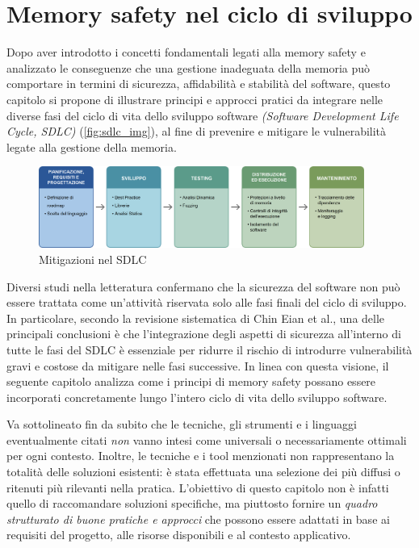 \chapter{Memory safety nel ciclo di sviluppo}
\label{cha:sdlc}

Dopo aver introdotto i concetti fondamentali legati alla memory safety e
analizzato le conseguenze che una gestione inadeguata della memoria può
comportare in termini di sicurezza, affidabilità e stabilità del software,
questo capitolo si propone di illustrare principi e approcci pratici da
integrare nelle diverse fasi del ciclo di vita dello sviluppo software \textit{(Software
Development Life Cycle, SDLC)} (\autoref{fig:sdlc_img}), al fine di prevenire e
mitigare le vulnerabilità legate alla gestione della memoria.

\begin{figure}[htbp]
  \centering
  \includegraphics[width=0.95\textwidth]{images/sdlc_recap.png}
  \caption[Schema SDLC]{Mitigazioni nel SDLC\protect}
  \label{fig:sdlc_img}
\end{figure}

Diversi studi nella letteratura confermano che la sicurezza del software non può
essere trattata come un'attività riservata solo alle fasi finali del ciclo di sviluppo.
In particolare, secondo la revisione sistematica di Chin Eian et al.\cite{security_in_sdlc},
una delle principali conclusioni è che l'integrazione degli aspetti di sicurezza
all'interno di tutte le fasi del SDLC è essenziale per ridurre il rischio di
introdurre vulnerabilità gravi e costose da mitigare nelle fasi successive. In linea
con questa visione, il seguente capitolo analizza come i principi di memory
safety possano essere incorporati concretamente lungo l'intero ciclo di vita
dello sviluppo software.

Va sottolineato fin da subito che le tecniche, gli strumenti e i linguaggi eventualmente
citati \textit{non} vanno intesi come universali o necessariamente ottimali per
ogni contesto. Inoltre, le tecniche e i tool menzionati non rappresentano la
totalità delle soluzioni esistenti: è stata effettuata una selezione dei più diffusi
o ritenuti più rilevanti nella pratica. L'obiettivo di questo capitolo non è
infatti quello di raccomandare soluzioni specifiche, ma piuttosto fornire un \textit{quadro
strutturato di buone pratiche e approcci} che possono essere adattati in base ai
requisiti del progetto, alle risorse disponibili e al contesto applicativo.






